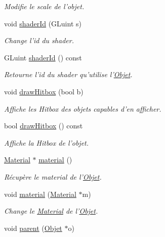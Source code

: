 \begin{DoxyCompactItemize}
\begin{DoxyCompactList}\small\item\em Modifie le scale de l'objet. \end{DoxyCompactList}\item 
void \hyperlink{class_objet_a13f08bf7d1265bbf4ade92b755b27c1b}{shader\+Id} (G\+Luint s)
\begin{DoxyCompactList}\small\item\em Change l'id du shader. \end{DoxyCompactList}\item 
G\+Luint \hyperlink{class_objet_a1a6a7ddf0136e2b685c07778b681c976}{shader\+Id} () const 
\begin{DoxyCompactList}\small\item\em Retourne l'id du shader qu'utilise l'\hyperlink{class_objet}{Objet}. \end{DoxyCompactList}\item 
void \hyperlink{class_objet_a3ce451437b7d7d22fdfd8cdb10b347fa}{draw\+Hitbox} (bool b)
\begin{DoxyCompactList}\small\item\em Affiche les Hitbox des objets capables d'en afficher. \end{DoxyCompactList}\item 
bool \hyperlink{class_objet_a17afdd67513cf35ab527af241cc7f769}{draw\+Hitbox} () const 
\begin{DoxyCompactList}\small\item\em Affiche la Hitbox de l'objet. \end{DoxyCompactList}\item 
\hyperlink{class_material}{Material} $\ast$ \hyperlink{class_objet_a5b8f371853435fb08bba5163cb4dbe09}{material} ()
\begin{DoxyCompactList}\small\item\em Récupère le material de l'\hyperlink{class_objet}{Objet}. \end{DoxyCompactList}\item 
void \hyperlink{class_objet_a470e028ee53141cf9d11d107317989b7}{material} (\hyperlink{class_material}{Material} $\ast$m)
\begin{DoxyCompactList}\small\item\em Change le \hyperlink{class_material}{Material} de l'\hyperlink{class_objet}{Objet}. \end{DoxyCompactList}\item 
void \hyperlink{class_objet_a95e63a98dc9dc485fe874df30f2069ee}{parent} (\hyperlink{class_objet}{Objet} $\ast$o)

\end{DoxyCompactItemize}
